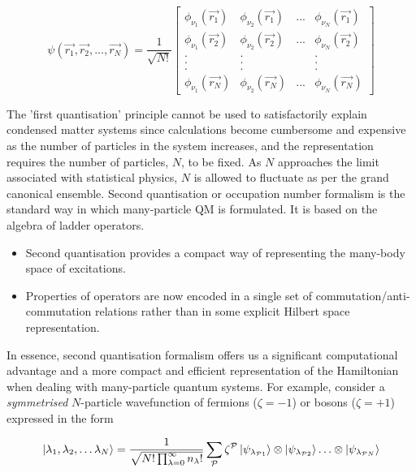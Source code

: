 \begin{equation*}
    \psi(\vec{r_{1}}, \vec{r_{2}},..., \vec{r_{N}}) = \frac{1}{\sqrt{N!}} \begin{bmatrix}
        \phi_{\nu_{1}}(\vec{r_{1}}) & \phi_{\nu_{2}}(\vec{r_{1}}) & ... & \phi_{\nu_{N}}(\vec{r_{1}}) \\
        \phi_{\nu_{1}}(\vec{r_{2}}) & \phi_{\nu_{2}}(\vec{r_{2}}) & ... & \phi_{\nu_{N}}(\vec{r_{2}}) \\
        . & . &  & . \\
        . & . &  & . \\
        . & . &  & . \\
        \phi_{\nu_{1}}(\vec{r_{N}}) & \phi_{\nu_{2}}(\vec{r_{N}}) & ... & \phi_{\nu_{N}}(\vec{r_{N}})
    \end{bmatrix}
\end{equation*}

The 'first quantisation' principle cannot be used to satisfactorily explain condensed matter systems since calculations become cumbersome and expensive as the number of particles in the system increases, and the representation requires the number of particles, $N$, to be fixed. As $N$ approaches the limit associated with statistical physics, $N$ is allowed to fluctuate as per the grand canonical ensemble. Second quantisation or occupation number formalism is the standard way in which many-particle QM is formulated. It is based on the algebra of ladder operators.

\begin{itemize}
    \item Second quantisation provides a compact way of representing the many-body space of excitations.
    \item Properties of operators are now encoded in a single set of commutation/anti-commutation relations rather than in some explicit Hilbert space representation. 
\end{itemize}

In essence, second quantisation formalism offers us a significant computational advantage and a more compact and efficient representation of the Hamiltonian when dealing with many-particle quantum systems. For example, consider a \textit{symmetrised} $N$-particle wavefunction of fermions ($\zeta = -1$) or bosons ($\zeta = +1$) expressed in the form 

\begin{equation}
    \ket{\lambda_{1}, \lambda_{2},\ldots \lambda_{N}} = \frac{1}{\sqrt{N! \prod_{\lambda=0}^{\infty}n_{\lambda}!}} \sum_{\mathcal{P}}\zeta^{\mathcal{P}} \ket{\psi_{\lambda_{\mathcal{P}1}}} \otimes \ket{\psi_{\lambda_{\mathcal{P}2}}} \ldots \otimes \ket{\psi_{\lambda_{\mathcal{P}N}}}
\end{equation}

